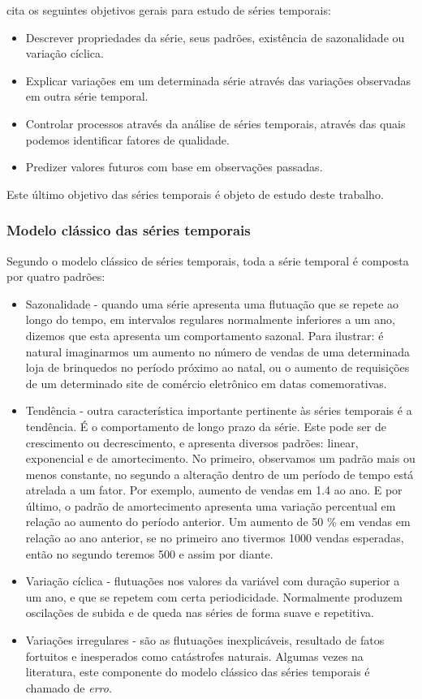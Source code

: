 \documentclass[twoside,english,brazilian]{UNISINOSmonografia}
\begin{document}
\cite{Ehlers2009} cita os seguintes objetivos gerais para estudo de séries temporais:

\begin{itemize}
	\item Descrever propriedades da série, seus padrões, existência de sazonalidade ou variação cíclica.
	\item Explicar variações em um determinada série através das variações observadas em outra série temporal.
	\item Controlar processos através da análise de séries temporais, através das quais podemos identificar fatores de qualidade.
	\item Predizer valores futuros com base em observações passadas. 
\end{itemize}

Este último objetivo das séries temporais é objeto de estudo deste trabalho.

\subsubsection{Modelo clássico das séries temporais}

Segundo o modelo clássico de séries temporais, toda a série temporal é composta por quatro padrões:

\begin{itemize}
	\item Sazonalidade - quando uma série apresenta uma flutuação que se repete ao longo do tempo, em intervalos regulares normalmente inferiores a um ano, dizemos que esta apresenta um comportamento sazonal. Para ilustrar: é natural imaginarmos um aumento no número de vendas de uma determinada loja de brinquedos no período próximo ao natal, ou o aumento de requisições de um determinado site de comércio eletrônico em datas comemorativas. 
	\item Tendência - outra característica importante pertinente às séries temporais é a tendência. É o comportamento de longo prazo da série. Este pode ser de crescimento ou decrescimento, e apresenta diversos padrões: linear, exponencial e de amortecimento. No primeiro, observamos um padrão mais ou menos constante, no segundo a alteração dentro de um período de tempo está atrelada a um fator. Por exemplo, aumento de vendas em 1.4 ao ano. E por último, o padrão de amortecimento apresenta uma variação percentual em relação ao aumento do período anterior. Um aumento de 50 \% em vendas em relação ao ano anterior, se no primeiro ano tivermos 1000 vendas esperadas, então no segundo teremos 500 e assim por diante.
	\item Variação cíclica - flutuações nos valores da variável com duração superior a um ano, e que se repetem com certa periodicidade. Normalmente produzem oscilações de subida e de queda nas séries de forma suave e repetitiva.
	\item Variações irregulares - são as flutuações inexplicáveis, resultado de fatos fortuitos e inesperados como catástrofes naturais. Algumas vezes na literatura, este componente do modelo clássico das séries temporais é chamado de \textit{erro}.
\end{itemize}
\end{document}

